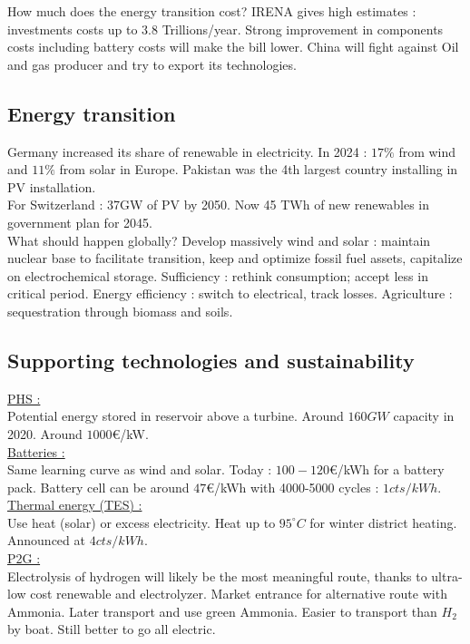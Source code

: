 \documentclass[../main.tex]{subfiles}
\begin{document}
How much does the energy transition cost? IRENA gives high estimates : investments costs up to $3.8$ Trillions/year. Strong improvement in components costs including battery costs will make the bill lower. China will fight against Oil and gas producer and try to export its technologies. \\

\subsection{Energy transition}
Germany increased its share of renewable in electricity. In 2024 : $17\%$ from wind and $11\%$ from solar in Europe. Pakistan was the 4th largest country installing in PV installation.\\

For Switzerland : 37GW of PV by 2050. Now 45 TWh of new renewables in government plan for 2045.\\

What should happen globally? Develop massively wind and solar : maintain nuclear base to facilitate transition, keep and optimize fossil fuel assets, capitalize on electrochemical storage. Sufficiency : rethink consumption; accept less in critical period. Energy efficiency : switch to electrical, track losses. Agriculture : sequestration through biomass and soils. \\

\subsection{Supporting technologies and sustainability}
\quad \underline{PHS :}\\
Potential energy stored in reservoir above a turbine. Around $160GW$ capacity in 2020. Around $1000$€/kW.\\

\quad \underline{Batteries :}\\
Same learning curve as wind and solar. Today : $100-120$€/kWh for a battery pack. Battery cell can be around $47$€/kWh with 4000-5000 cycles : $1cts/kWh$.\\

\quad \underline{Thermal energy (TES) :}\\
Use heat (solar) or excess electricity. Heat up to $95^\circ C$ for winter district heating. Announced at $4cts/kWh$.\\

\quad \underline{P2G :}\\
Electrolysis of hydrogen will likely be the most meaningful route, thanks to ultra-low cost renewable and electrolyzer. Market entrance for alternative route with Ammonia. Later transport and use green Ammonia. Easier to transport than $H_2$ by boat. Still better to go all electric.\\
\end{document}
